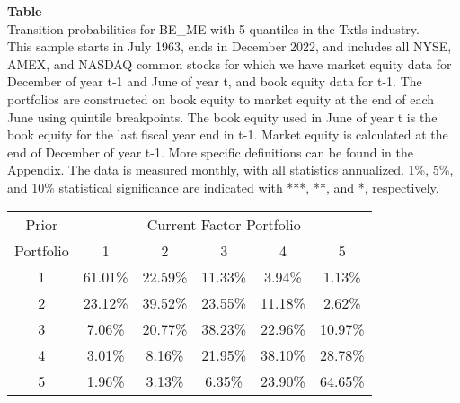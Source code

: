 \begin{table*}[ht!]
\raggedright
{}
\label{tab: transition_probs_BE_ME_Txtls_with_5_quantiles}
\textbf{Table \thetable} \\
Transition probabilities for BE_ME with 5 quantiles in the Txtls industry. \\
\hspace*{1em}This sample starts in July 1963, ends in December 2022, and includes all NYSE, AMEX, and NASDAQ common stocks for which we have market equity data for December of year t-1 and June of year t, and book equity data for t-1. The portfolios are constructed on book equity to market equity at the end of each June using quintile breakpoints.  The book equity used in June of year t is the book equity for the last fiscal year end in t-1.  Market equity is calculated at the end of December of year t-1.  More specific definitions can be found in the Appendix.  The data is measured monthly, with all statistics annualized.  1\%, 5\%, and 10\% statistical significance are indicated with ***, **, and *, respectively. \\
\vspace{0.5em}
\centering
\begin{adjustbox}{max width=\textwidth}
\begin{tabular}{@{}cccccc@{}}
\toprule
Prior & \multicolumn{5}{c}{Current Factor Portfolio} \\
Portfolio & 1 & 2 & 3 & 4 & 5 \\
\midrule
1 & 61.01\% & 22.59\% & 11.33\% & 3.94\% & 1.13\% \\
2 & 23.12\% & 39.52\% & 23.55\% & 11.18\% & 2.62\% \\
3 & 7.06\% & 20.77\% & 38.23\% & 22.96\% & 10.97\% \\
4 & 3.01\% & 8.16\% & 21.95\% & 38.10\% & 28.78\% \\
5 & 1.96\% & 3.13\% & 6.35\% & 23.90\% & 64.65\% \\
\bottomrule
\end{tabular}
\end{adjustbox}
\end{table*}